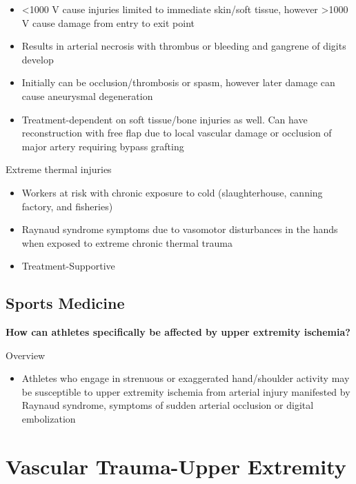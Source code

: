 \documentclass[
]{book}
\providecommand{\tightlist}{%
  \setlength{\itemsep}{0pt}\setlength{\parskip}{0pt}}
\begin{document}
\begin{itemize}
\item
  \textless1000 V cause injuries limited to immediate skin/soft tissue,
  however \textgreater1000 V cause damage from entry to exit point~
\item
  Results in arterial necrosis with thrombus or bleeding and gangrene
  of digits develop~
\item
  Initially can be occlusion/thrombosis or spasm, however later damage
  can cause aneurysmal degeneration~
\item
  Treatment-dependent on soft tissue/bone injuries as well. Can have
  reconstruction with free flap due to local vascular damage or
  occlusion of major artery requiring bypass grafting
\end{itemize}

Extreme thermal injuries

\begin{itemize}
\item
  Workers at risk with chronic exposure to cold (slaughterhouse,
  canning factory, and fisheries)
\item
  Raynaud syndrome symptoms due to vasomotor disturbances in the hands
  when exposed to extreme chronic thermal trauma
\item
  Treatment-Supportive~
\end{itemize}

\hypertarget{sports-medicine}{%
\subsection{Sports Medicine}\label{sports-medicine}}

\textbf{How can athletes specifically be affected by upper extremity
ischemia?}

Overview

\begin{itemize}
\tightlist
\item
  Athletes who engage in strenuous or exaggerated hand/shoulder
  activity may be susceptible to upper extremity ischemia from
  arterial injury manifested by Raynaud syndrome, symptoms of sudden
  arterial occlusion or digital embolization
\end{itemize}

\hypertarget{vascular-trauma-upper-extremity}{%
\section{Vascular Trauma-Upper Extremity}\label{vascular-trauma-upper-extremity}}
\end{document}

